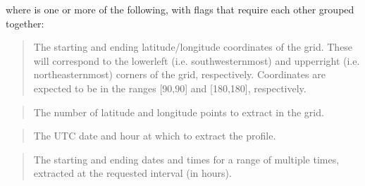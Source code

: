 \documentclass[letterpaper,10pt,english]{sphinxmanual}
\begin{document}
\sphinxAtStartPar
where \sphinxcode{\sphinxupquote{{[}flags{]}}} is one or more of the following, with flags that require each other grouped together:

\sphinxAtStartPar
{}

\sphinxAtStartPar
{}
\begin{quote}

\sphinxAtStartPar
The starting and ending latitude/longitude coordinates of the grid.  These will correspond to the lower\sphinxhyphen{}left (i.e. southwesternmost) and upper\sphinxhyphen{}right (i.e. northeasternmost) corners of the grid, respectively.  Coordinates are expected to be in the ranges {[}\sphinxhyphen{}90,90{]} and {[}\sphinxhyphen{}180,180{]}, respectively.
\end{quote}

\sphinxAtStartPar
{}
\begin{quote}

\sphinxAtStartPar
The number of latitude and longitude points to extract in the grid.
\end{quote}

\sphinxAtStartPar
{}

\sphinxAtStartPar
{}
\begin{quote}

\sphinxAtStartPar
The UTC date and hour  at which to extract the profile.
\end{quote}

\sphinxAtStartPar
{}

\sphinxAtStartPar
{}
\begin{quote}

\sphinxAtStartPar
The starting and ending dates and times for a range of multiple times, extracted at the requested interval (in hours).
\end{quote}
\end{document}
